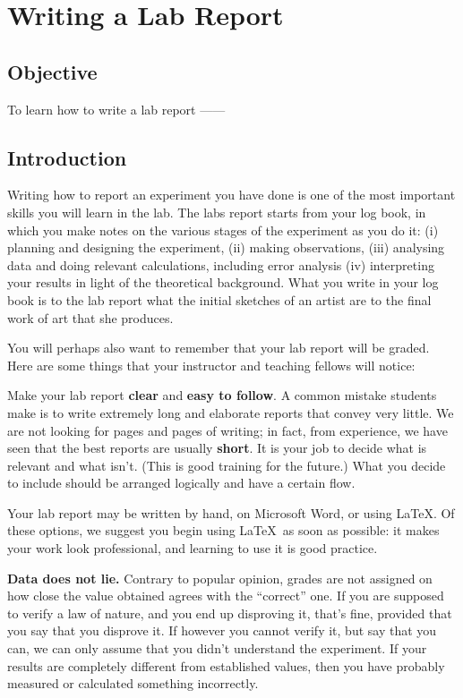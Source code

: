 \chapter{Writing a Lab Report}

\section{Objective}

To learn how to write a lab report ------

\section{Introduction}

Writing how to report an experiment you have done is one of the most important skills you will learn in the lab. The labs report starts from your log book, in which you make notes on the various stages of the experiment as you do it: (i) planning and designing the experiment, (ii) making observations, (iii) analysing data and doing relevant calculations, including error analysis (iv) interpreting your results in light of the theoretical background. What you write in your log book is to the lab report what the initial sketches of an artist are to the final work of art that she produces.

You will perhaps also want to remember that your lab report will be graded. Here are some things that your instructor and teaching fellows will notice:

Make your lab report \textbf{clear} and \textbf{easy to follow}. A common mistake students make is to write extremely long and elaborate reports that convey very little. We are not looking for pages and pages of writing; in fact, from experience, we have seen that the best reports are usually \textbf{short}. It is your job to decide what is relevant and what isn't. (This is good training for the future.) What you decide to include should be arranged logically and have a certain flow. 

\begin{imp}
Your lab report may be written by hand, on Microsoft Word, or using \LaTeX. Of these options, we suggest you begin using \LaTeX\, as soon as possible: it makes your work look professional, and learning to use it is good practice.
\end{imp}

\textbf{Data does not lie.} Contrary to popular opinion, grades are not assigned on how close the value obtained agrees with the ``correct'' one. If you are supposed to verify a law of nature, and you end up disproving it, that's fine, provided that you say that you disprove it. If however you cannot verify it, but say that you can, we can only assume that you didn't understand the experiment. If your results are completely different from established values, then you have probably measured or calculated something incorrectly. 

